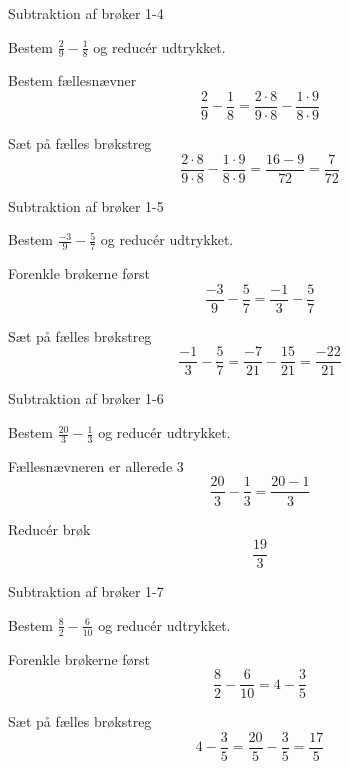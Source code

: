 \documentclass{article}
\begin{document}
\newpage

\begin{exercise}{Subtraktion af brøker 1-4}

Bestem $\frac{2}{9} - \frac{1}{8}$ og reducér udtrykket.


\hint

Bestem fællesnævner
\[
\frac{2}{9} - \frac{1}{8} = \frac{2 \cdot 8}{9 \cdot 8} - \frac{1 \cdot 9}{8\cdot 9}
\]

\hint

Sæt på fælles brøkstreg
\[
\frac{2 \cdot 8}{9 \cdot 8} - \frac{1 \cdot 9}{8\cdot 9} = \frac{16 - 9}{72} = \frac{7}{72}
\]

\end{exercise}

\newpage

\begin{exercise}{Subtraktion af brøker 1-5}

Bestem $\frac{-3}{9} - \frac{5}{7}$ og reducér udtrykket.


\hint

Forenkle brøkerne først
\[
\frac{-3}{9} - \frac{5}{7} = \frac{-1}{3} - \frac{5}{7}
\]

\hint

Sæt på fælles brøkstreg
\[
\frac{-1}{3} - \frac{5}{7} = \frac{-7}{21} - \frac{15}{21} = \frac{-22}{21}
\]

\end{exercise}

\newpage

\begin{exercise}{Subtraktion af brøker 1-6}

Bestem $\frac{20}{3} - \frac{1}{3}$ og reducér udtrykket.


\hint

Fællesnævneren er allerede 3
\[
\frac{20}{3} - \frac{1}{3} = \frac{20 - 1}{3}
\]

\hint

Reducér brøk
\[
\frac{19}{3}
\]

\end{exercise}

\newpage

\begin{exercise}{Subtraktion af brøker 1-7}

Bestem $\frac{8}{2} - \frac{6}{10}$ og reducér udtrykket.


\hint

Forenkle brøkerne først
\[
\frac{8}{2} - \frac{6}{10} = 4 - \frac{3}{5}
\]

\hint

Sæt på fælles brøkstreg
\[
4 - \frac{3}{5} = \frac{20}{5} - \frac{3}{5} = \frac{17}{5}
\]

\end{exercise}
\end{document}
